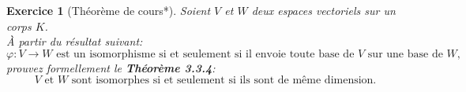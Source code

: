 \documentclass[11pt,french,table]{article}
\theoremstyle{exercice}
\newtheorem{exercice}{Exercice}
\begin{document}
\vspace{2em}
\begin{exercice}[Théorème de cours*]
Soient $V$ et $W$ deux espaces vectoriels sur un corps $K$. \\
À partir du résultat suivant: $$\varphi : V \longrightarrow W \text{ est un isomorphisme si et seulement si il envoie toute base de } V \text{ sur une base de } W,$$
prouvez formellement le \textbf{Théorème 3.3.4}:
$$ V \text{ et } W \text{ sont isomorphes si et seulement si ils sont de même dimension.}$$
\end{exercice}
\vspace{2em}
\end{document}

